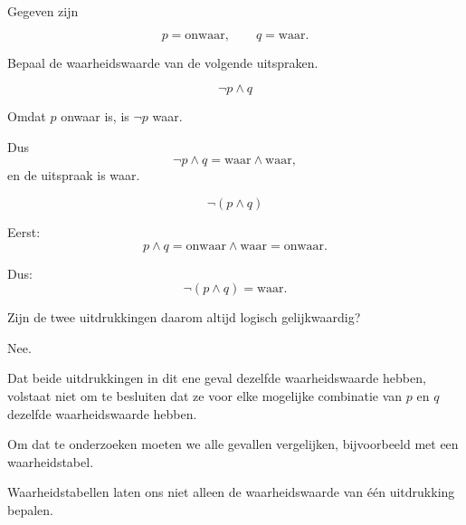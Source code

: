 \documentclass{ximera}
\begin{document}
  \begin{oefening}{\oefU \ESS}

  Gegeven zijn

  \[
  p=\text{onwaar},
  \qquad
  q=\text{waar}.
  \]

  Bepaal de waarheidswaarde van de volgende uitspraken.

  \begin{question}
  \[
  \neg p\land q
  \]

  \begin{oplossing}
  Omdat $p$ onwaar is, is $\neg p$ waar.

  Dus
  \[
  \neg p\land q
  =
  \text{waar}\land\text{waar},
  \]
  en de uitspraak is waar.
  \end{oplossing}
  \end{question}


  \begin{question}
  \[
  \neg(p\land q)
  \]

  \begin{oplossing}
  Eerst:
  \[
  p\land q
  =
  \text{onwaar}\land\text{waar}
  =
  \text{onwaar}.
  \]

  Dus:
  \[
  \neg(p\land q)
  =
  \text{waar}.
  \]
  \end{oplossing}
  \end{question}


  \begin{question}
  Zijn de twee uitdrukkingen daarom altijd logisch gelijkwaardig?

  \begin{oplossing}
  Nee.

  Dat beide uitdrukkingen in dit ene geval dezelfde waarheidswaarde
  hebben, volstaat niet om te besluiten dat ze voor elke mogelijke
  combinatie van $p$ en $q$ dezelfde waarheidswaarde hebben.

  Om dat te onderzoeken moeten we alle gevallen vergelijken,
  bijvoorbeeld met een waarheidstabel.
  \end{oplossing}
  \end{question}

  \end{oefening}



  Waarheidstabellen laten ons niet alleen de waarheidswaarde van één
  uitdrukking bepalen.
\end{document}
